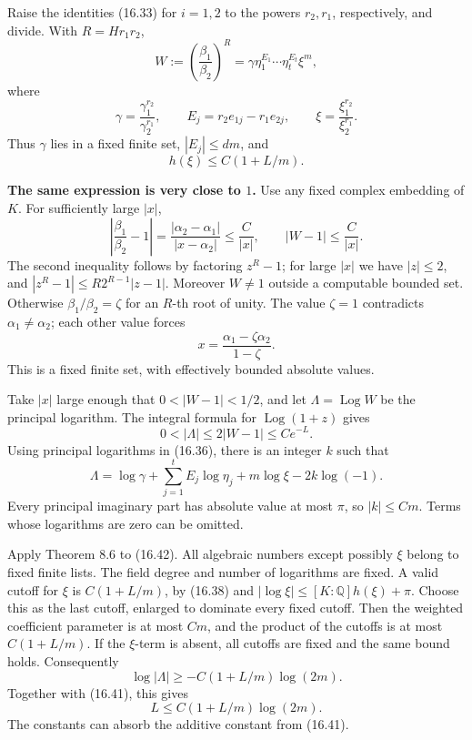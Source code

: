 \documentclass[
  11pt,
  a4paper,
]{article}
\begin{document}
Raise the identities (16.33) for \(i=1,2\) to the powers \(r_2,r_1\),
respectively, and divide. With \(R=Hr_1r_2\), \[
 W:=\left(\frac{\beta_1}{\beta_2}\right)^R
    =\gamma\eta_1^{E_1}\cdots\eta_t^{E_t}\xi^m,
 \tag{16.36}
\] where \[
 \gamma=\frac{\gamma_1^{r_2}}{\gamma_2^{r_1}},\qquad
 E_j=r_2e_{1j}-r_1e_{2j},\qquad
 \xi=\frac{\xi_1^{r_2}}{\xi_2^{r_1}}.
 \tag{16.37}
\] Thus \(\gamma\) lies in a fixed finite set, \(|E_j|\leq dm\), and \[
 h(\xi)\leq C(1+L/m).
 \tag{16.38}
\]

\textbf{The same expression is very close to \(1\).} Use any fixed
complex embedding of \(K\). For sufficiently large \(|x|\), \[
 \left|\frac{\beta_1}{\beta_2}-1\right|
 =\frac{|\alpha_2-\alpha_1|}{|x-\alpha_2|}
 \leq\frac C{|x|},\qquad
 |W-1|\leq\frac C{|x|}.
 \tag{16.39}
\] The second inequality follows by factoring \(z^R-1\); for large
\(|x|\) we have \(|z|\leq2\), and \(|z^R-1|\leq R2^{R-1}|z-1|\).
Moreover \(W\ne1\) outside a computable bounded set. Otherwise
\(\beta_1/\beta_2=\zeta\) for an \(R\)-th root of unity. The value
\(\zeta=1\) contradicts \(\alpha_1\ne\alpha_2\); each other value forces
\[
 x=\frac{\alpha_1-\zeta\alpha_2}{1-\zeta}.
 \tag{16.40}
\] This is a fixed finite set, with effectively bounded absolute values.

Take \(|x|\) large enough that \(0<|W-1|<1/2\), and let
\(\Lambda=\operatorname{Log}W\) be the principal logarithm. The integral
formula for \(\operatorname{Log}(1+z)\) gives \[
 0<|\Lambda|\leq2|W-1|\leq Ce^{-L}.
 \tag{16.41}
\] Using principal logarithms in (16.36), there is an integer \(k\) such
that \[
 \Lambda=\log\gamma+\sum_{j=1}^t E_j\log\eta_j
             +m\log\xi-2k\log(-1).
 \tag{16.42}
\] Every principal imaginary part has absolute value at most \(\pi\), so
\(|k|\leq Cm\). Terms whose logarithms are zero can be omitted.

Apply Theorem 8.6 to (16.42). All algebraic numbers except possibly
\(\xi\) belong to fixed finite lists. The field degree and number of
logarithms are fixed. A valid cutoff for \(\xi\) is \(C(1+L/m)\), by
(16.38) and \(|\log\xi|\leq [K:\mathbb Q]h(\xi)+\pi\). Choose this as
the last cutoff, enlarged to dominate every fixed cutoff. Then the
weighted coefficient parameter is at most \(Cm\), and the product of the
cutoffs is at most \(C(1+L/m)\). If the \(\xi\)-term is absent, all
cutoffs are fixed and the same bound holds. Consequently \[
 \log|\Lambda|\geq-C(1+L/m)\log(2m).
 \tag{16.43}
\] Together with (16.41), this gives \[
 L\leq C(1+L/m)\log(2m).
 \tag{16.44}
\] The constants can absorb the additive constant from (16.41).
\end{document}
